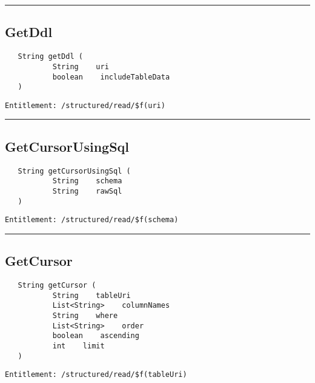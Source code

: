 \rule{12cm}{2pt}
\subsection{GetDdl}
\label{Api:GetDdl}
\begin{verbatim}
   String getDdl (
           String    uri
           boolean    includeTableData
   )
\end{verbatim}
\begin{Verbatim}[fontsize=\small, formatcom=\color{Maroon}]
  Entitlement: /structured/read/$f(uri)
\end{Verbatim}



\rule{12cm}{2pt}
\subsection{GetCursorUsingSql}
\label{Api:GetCursorUsingSql}
\begin{verbatim}
   String getCursorUsingSql (
           String    schema
           String    rawSql
   )
\end{verbatim}
\begin{Verbatim}[fontsize=\small, formatcom=\color{Maroon}]
  Entitlement: /structured/read/$f(schema)
\end{Verbatim}



\rule{12cm}{2pt}
\subsection{GetCursor}
\label{Api:GetCursor}
\begin{verbatim}
   String getCursor (
           String    tableUri
           List<String>    columnNames
           String    where
           List<String>    order
           boolean    ascending
           int    limit
   )
\end{verbatim}
\begin{Verbatim}[fontsize=\small, formatcom=\color{Maroon}]
  Entitlement: /structured/read/$f(tableUri)
\end{Verbatim}



